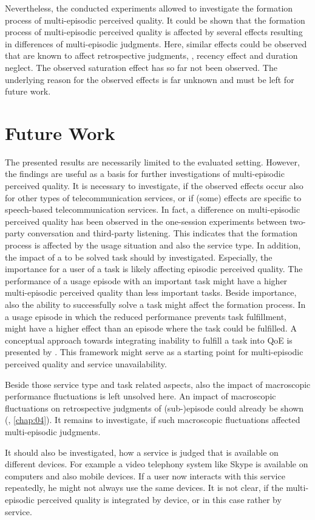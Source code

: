 Nevertheless, the conducted experiments allowed to investigate the formation process of multi-episodic perceived quality.
It could be shown that the formation process of multi-episodic perceived quality is affected by several effects resulting in differences of multi-episodic judgments.
Here, similar effects could be observed that are known to affect retrospective judgments, \ie, recency effect and duration neglect.
The observed saturation effect has so far not been observed.
The underlying reason for the observed effects is far unknown and must be left for future work.

\section{Future Work}
The presented results are necessarily limited to the evaluated setting.
However, the findings are useful as a basis for further investigations of multi-episodic perceived quality.
It is necessary to investigate, if the observed effects occur also for other types of telecommunication services, or if (some) effects are specific to speech-based telecommunication services.
In fact, a difference on multi-episodic perceived quality has been observed in the one-session experiments between two-party conversation and third-party listening.
This indicates that the formation process is affected by the usage situation and also the service type.
In addition, the impact of a to be solved task should by investigated.
Especially, the importance for a user of a task is likely affecting episodic perceived quality.
The performance of a usage episode with an important task might have a higher multi-episodic perceived quality than less important tasks.
Beside importance, also the ability to successfully solve a task might affect the formation process.
In a usage episode in which the reduced performance prevents task fulfillment, might have a higher effect than an episode where the task could be fulfilled.
A conceptual approach towards integrating inability to fulfill a task into \ac{QoE} is presented by \citet{leon-garcia_generalizing_2014}.
This framework might serve as a starting point for multi-episodic perceived quality and service unavailability.

Beside those service type and task related aspects, also the impact of macroscopic performance fluctuations is left unsolved here.
An impact of macroscopic fluctuations on retrospective judgments of (sub-)episode could already be shown (\cf, \autoref{chap:04}).
It remains to investigate, if such macroscopic fluctuations affected multi-episodic judgments.

It should also be investigated, how a service is judged that is available on different devices.
For example a video telephony system like Skype is available on computers and also mobile devices.
If a user now interacts with this service repeatedly, he might not always use the same devices.
It is not clear, if the multi-episodic perceived quality is integrated by device, or in this case rather by service.